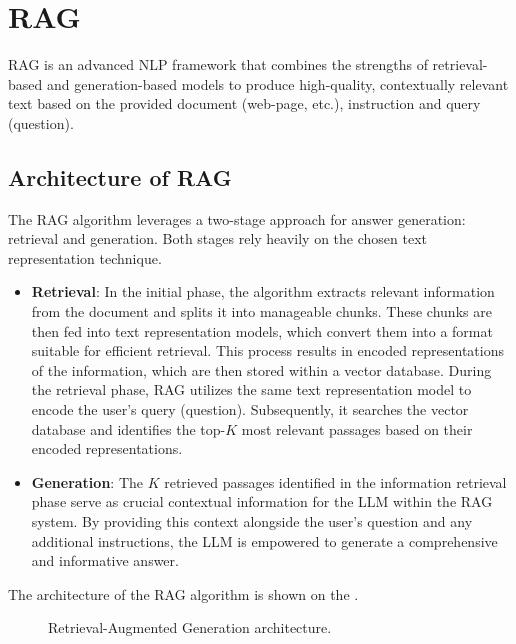 \section{\acf{RAG}}
\ac{RAG} \cite{lewis2021retrievalaugmented} \nocite{umarjamilai} is an advanced \ac{NLP} framework that combines the strengths of retrieval-based and generation-based models to produce high-quality, contextually relevant text based on the provided document (web-page, etc.), instruction and query (question). 

\subsection{Architecture of \ac{RAG}}
The \ac{RAG} algorithm leverages a two-stage approach for answer generation: retrieval and generation.
Both stages rely heavily on the chosen text representation technique.

\begin{itemize}
  \item \textbf{Retrieval}:
    In the initial phase, the algorithm extracts relevant information from the document and splits it into manageable chunks.
    These chunks are then fed into text representation models, which convert them into a format suitable for efficient retrieval.
    This process results in encoded representations of the information, which are then stored within a vector database.
    During the retrieval phase, \ac{RAG} utilizes the same text representation model to encode the user's query (question).
    Subsequently, it searches the vector database and identifies the top-$K$ most relevant passages based on their encoded representations.
  \item \textbf{Generation}:
    The $K$ retrieved passages identified in the information retrieval phase serve as crucial contextual information for the \ac{LLM} within the \ac{RAG} system.
    By providing this context alongside the user's question and any additional instructions, the \ac{LLM} is empowered to generate a comprehensive and informative answer.
\end{itemize}

The architecture of the \ac{RAG} algorithm is shown on the .

\begin{figure}[h]
 \centering
  
 \caption{Retrieval-Augmented Generation architecture.}
  \label{fig:RAG_scheme}
\end{figure}

